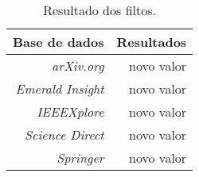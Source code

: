 \begin{table}[!htb]
    \centering
    \caption[Resultado dos filtros aplicados nas buscas por artigos]{Resultado dos filtos.
    \label{tab:resultadosFiltros1}}
    \begin{tabular}{rr}
        \toprule
           \textbf{Base de dados} & \textbf{Resultados} \\ \hline
        \midrule
            \textit{arXiv.org}              & novo valor                   \\
		\textit{Emerald Insight}        & novo valor                   \\
		\textit{IEEEXplore}             & novo valor                  \\
		\textit{Science Direct}         & novo valor                    \\
		\textit{Springer}               & novo valor                    \\ \hline
        \bottomrule
    \end{tabular}
\end{table}
